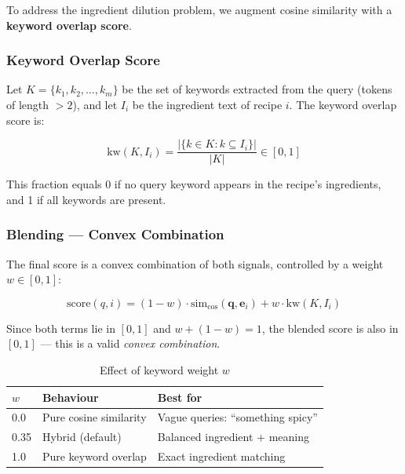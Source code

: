 \documentclass[12pt,a4paper]{article}
\begin{document}
To address the ingredient dilution problem, we augment cosine similarity with
a \textbf{keyword overlap score}.

\subsubsection{Keyword Overlap Score}

Let $K = \{k_1, k_2, \ldots, k_m\}$ be the set of keywords extracted from the
query (tokens of length $> 2$), and let $I_i$ be the ingredient text of
recipe $i$. The keyword overlap score is:

\begin{equation}
  \text{kw}(K, I_i) = \frac{|\{k \in K : k \subseteq I_i\}|}{|K|}
  \in [0, 1]
\end{equation}

This fraction equals 0 if no query keyword appears in the recipe's
ingredients, and 1 if all keywords are present.

\subsubsection{Blending — Convex Combination}

The final score is a convex combination of both signals, controlled by a
weight $w \in [0, 1]$:

\begin{equation}
  \boxed{
    \text{score}(q, i) = (1 - w)\cdot\text{sim}_{\cos}(\mathbf{q}, \mathbf{e}_i)
    + w \cdot \text{kw}(K, I_i)
  }
\end{equation}

Since both terms lie in $[0, 1]$ and $w + (1-w) = 1$, the blended score is
also in $[0, 1]$ — this is a valid \emph{convex combination}.

\begin{table}[H]
  \centering
  \begin{tabular}{lll}
    \toprule
    $w$ & Behaviour & Best for \\
    \midrule
    0.0 & Pure cosine similarity & Vague queries: ``something spicy'' \\
    0.35 & Hybrid (default) & Balanced ingredient + meaning \\
    1.0 & Pure keyword overlap & Exact ingredient matching \\
    \bottomrule
  \end{tabular}
  \caption{Effect of keyword weight $w$}
\end{table}
\end{document}
